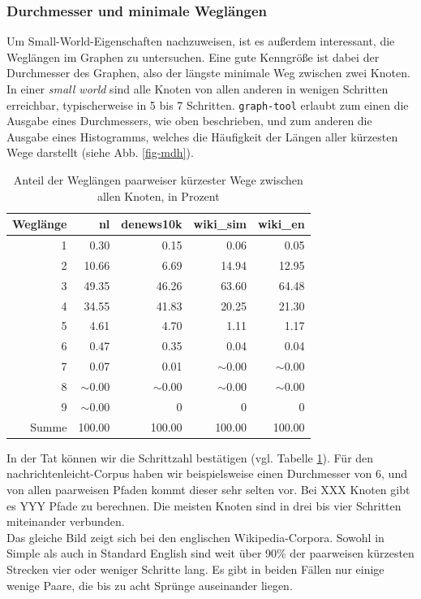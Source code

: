 \documentclass[11pt, a4paper]{article}
\begin{document}
\subsubsection{Durchmesser und minimale Wegl\"angen}
Um Small-World-Eigenschaften nachzuweisen, ist es außerdem interessant, die
Weglängen im Graphen zu untersuchen. Eine gute Kenngröße ist dabei der Durchmesser
des Graphen, also der längste minimale Weg zwischen zwei Knoten. In einer
\emph{small world} sind alle Knoten von allen anderen in wenigen Schritten
erreichbar, typischerweise in 5 bis 7 Schritten. \texttt{graph-tool}
erlaubt zum einen die Ausgabe eines Durchmessers, wie oben beschrieben, und zum
anderen die Ausgabe eines Histogramms, welches die Häufigkeit der Längen aller
kürzesten Wege darstellt (siehe Abb. \ref{fig-mdh}).

\begin{table}[ht]
    \centering
    \begin{tabular}{rrrrr}
      \toprule
    Weglänge & nl & denews10k & wiki\_sim & wiki\_en \\ 
      \midrule
      1 & 0.30      & 0.15      & 0.06      & 0.05 \\ 
      2 & 10.66     & 6.69      & 14.94     & 12.95 \\ 
      3 & 49.35     & 46.26     & 63.60     & 64.48 \\ 
      4 & 34.55     & 41.83     & 20.25     & 21.30 \\ 
      5 & 4.61      & 4.70      & 1.11      & 1.17 \\ 
      6 & 0.47      & 0.35      & 0.04      & 0.04 \\ 
      7 & 0.07      & 0.01      & $\sim$0.00  & $\sim$0.00 \\ 
      8 & $\sim$0.00  & $\sim$0.00  & $\sim$0.00  & $\sim$0.00 \\ 
      9 & $\sim$0.00  & 0         & 0         & 0 \\ 
      Summe & 100.00  & 100.00    & 100.00    & 100.00 \\ 
       \bottomrule
    \end{tabular}
    \caption{Anteil der Weglängen paarweiser kürzester Wege zwischen allen Knoten, in Prozent}
    \label{md-perc}
\end{table}


In der Tat können wir die Schrittzahl bestätigen (vgl. Tabelle \ref{md-perc}).
Für den nachrichtenleicht-Corpus haben wir beispielsweise einen Durchmesser von
6, und von
allen paarweisen Pfaden kommt dieser sehr selten vor. Bei XXX Knoten gibt
es YYY Pfade zu berechnen. Die meisten Knoten sind in drei bis vier Schritten
miteinander verbunden.\\
Das gleiche Bild zeigt sich bei den englischen Wikipedia-Corpora. Sowohl in 
Simple als auch in Standard English sind weit über 90\% der paarweisen
kürzesten Strecken vier oder weniger Schritte lang. Es gibt in beiden Fällen nur
einige wenige Paare, die bis zu acht Sprünge auseinander liegen.
\end{document}
